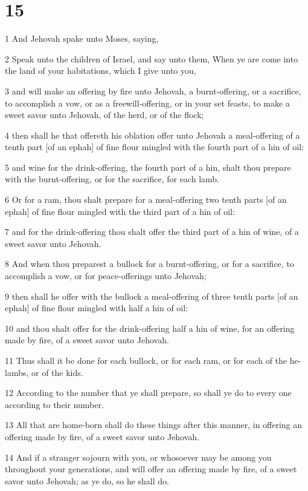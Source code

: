 \chapter{15}

\par 1 And Jehovah spake unto Moses, saying,
\par 2 Speak unto the children of Israel, and say unto them, When ye are come into the land of your habitations, which I give unto you,
\par 3 and will make an offering by fire unto Jehovah, a burnt-offering, or a sacrifice, to accomplish a vow, or as a freewill-offering, or in your set feasts, to make a sweet savor unto Jehovah, of the herd, or of the flock;
\par 4 then shall he that offereth his oblation offer unto Jehovah a meal-offering of a tenth part [of an ephah] of fine flour mingled with the fourth part of a hin of oil:
\par 5 and wine for the drink-offering, the fourth part of a hin, shalt thou prepare with the burnt-offering, or for the sacrifice, for each lamb.
\par 6 Or for a ram, thou shalt prepare for a meal-offering two tenth parts [of an ephah] of fine flour mingled with the third part of a hin of oil:
\par 7 and for the drink-offering thou shalt offer the third part of a hin of wine, of a sweet savor unto Jehovah.
\par 8 And when thou preparest a bullock for a burnt-offering, or for a sacrifice, to accomplish a vow, or for peace-offerings unto Jehovah;
\par 9 then shall he offer with the bullock a meal-offering of three tenth parts [of an ephah] of fine flour mingled with half a hin of oil:
\par 10 and thou shalt offer for the drink-offering half a hin of wine, for an offering made by fire, of a sweet savor unto Jehovah.
\par 11 Thus shall it be done for each bullock, or for each ram, or for each of the he-lambs, or of the kids.
\par 12 According to the number that ye shall prepare, so shall ye do to every one according to their number.
\par 13 All that are home-born shall do these things after this manner, in offering an offering made by fire, of a sweet savor unto Jehovah.
\par 14 And if a stranger sojourn with you, or whosoever may be among you throughout your generations, and will offer an offering made by fire, of a sweet savor unto Jehovah; as ye do, so he shall do.
